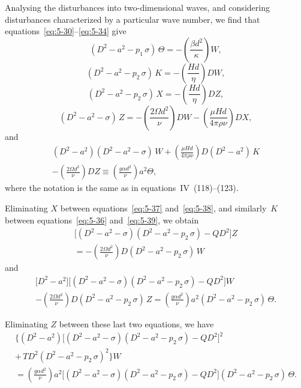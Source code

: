 Analysing the disturbances into two-dimensional waves, and considering
disturbances characterized by a particular wave number, we find that
equations~\eqref{eq:5-30}--\eqref{eq:5-34} give
\begin{equation}
  (D^{2}-a^{2}-p_1\,\sigma)\,\Theta
  = -\left(\frac{\beta d^{2}}{\kappa}\right)W,
  \label{eq:5-35}
\end{equation}
\begin{equation}
  (D^{2}-a^{2}-p_2\,\sigma)\,K
  = -\left(\frac{Hd}{\eta}\right)DW,
  \label{eq:5-36}
\end{equation}
\begin{equation}
  (D^{2}-a^{2}-p_2\,\sigma)\,X
  = -\left(\frac{Hd}{\eta}\right)DZ,
  \label{eq:5-37}
\end{equation}
\begin{equation}
  (D^{2}-a^{2}-\sigma)\,Z
  = -\left(\frac{2\Omega d^{2}}{\nu}\right)DW
  - \left(\frac{\mu Hd}{4\pi\rho\nu}\right)DX,
  \label{eq:5-38}
\end{equation}
and
\begin{multline}
  (D^{2}-a^{2})
  (D^{2}-a^{2}-\sigma)\,W
  + \left(\frac{\mu Hd}{4\pi\rho\nu}\right)
  D(D^{2}-a^{2})\,K \\
  - \left(\frac{2\Omega d^{2}}{\nu}\right)DZ
  \equiv \left(\frac{g\alpha d^{2}}{\nu}\right)a^{2}\Theta,
  \label{eq:5-39}
\end{multline}
where the notation is the same as in equations~IV~(118)--(123).

Eliminating $X$ between equations~\eqref{eq:5-37} and~\eqref{eq:5-38},
and similarly~$K$ between equations~\eqref{eq:5-36}
and~\eqref{eq:5-39}, we obtain
\begin{multline}
  \bigl[(D^{2}-a^{2}-\sigma)(D^{2}-a^{2}-p_2\,\sigma)
    -QD^{2}\bigr]Z \\
  = -\left(\frac{2\Omega d^{2}}{\nu}\right)
  D(D^{2}-a^{2}-p_2\,\sigma)\,W
  \label{eq:5-40}
\end{multline}
and
\begin{multline}
  \bigl[D^{2}-a^{2}\bigr]
  \bigl[(D^{2}-a^{2}-\sigma)(D^{2}-a^{2}-p_2\,\sigma)
    -QD^{2}\bigr]W \\
  -\left(\frac{2\Omega d^{2}}{\nu}\right)
  D(D^{2}-a^{2}-p_2\,\sigma)\,Z
  = \left(\frac{g\alpha d^{2}}{\nu}\right)
  a^{2}(D^{2}-a^{2}-p_2\,\sigma)\,\Theta.
  \label{eq:5-41}
\end{multline}

Eliminating $Z$ between these last two equations, we have
\begin{multline}
  \bigl\{(D^{2}\!-\!a^{2})
    \bigl[(D^{2}\!-\!a^{2}\!-\!\sigma)(D^{2}\!-\!a^{2}\!-\!p_2\,\sigma)
      -QD^{2}\bigr]^{2} \\
  +\,T D^{2}(D^{2}\!-\!a^{2}\!-\!p_2\,\sigma)^{2}\bigr\}W \\
  = \left(\frac{g\alpha d^{2}}{\nu}\right)
  a^{2}\bigl[(D^{2}\!-\!a^{2}\!-\!\sigma)(D^{2}\!-\!a^{2}\!-\!p_2\,\sigma)
    -QD^{2}\bigr]
  (D^{2}\!-\!a^{2}\!-\!p_2\,\sigma)\,\Theta.
  \label{eq:5-42}
\end{multline}

